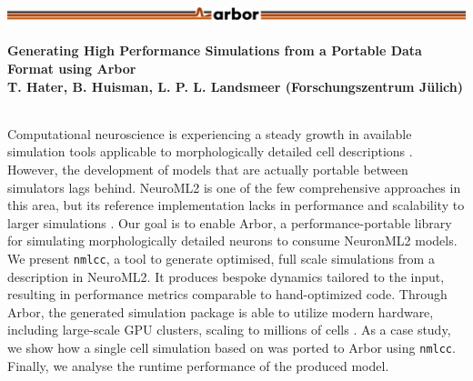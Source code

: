 \documentclass{beamer}
\begin{document}
\newcommand{\nmlcc}{\texttt{nmlcc}}

\begin{frame}[t, fragile]
  \frametitle{\includegraphics[width=0.66\linewidth]{img/arbor-lines-proto-colour-full}}
  \framesubtitle{Generating High Performance Simulations from a Portable Data Format using Arbor\\
    \tiny{T. Hater, B. Huisman, L. P. L. Landsmeer (Forschungszentrum Jülich)}}
  \begin{columns}[onlytextwidth,T]
    \begin{column}{0.76\textwidth}
      Computational neuroscience is experiencing a steady growth in available
      simulation tools applicable to morphologically detailed cell descriptions
      \cite{eden, neurogpu, carl, brian, arb, nrn}. However, the development of
      models that are actually portable between simulators lags behind. NeuroML2
      is one of the few comprehensive approaches in this area, but its reference
      implementation lacks in performance and scalability to larger simulations
      \cite{nml2}. Our goal is to enable Arbor, a performance-portable library
      for simulating morphologically detailed neurons to consume NeuronML2
      models. We present \nmlcc, a tool to generate optimised, full scale
      simulations from a description in NeuroML2. It produces bespoke dynamics
      tailored to the input, resulting in performance metrics comparable to
      hand-optimized code. Through Arbor, the generated simulation package is
      able to utilize modern hardware, including large-scale GPU clusters,
      scaling to millions of cells \cite{arb}. As a case study, we show how a
      single cell simulation based on \cite{Hay} was ported to Arbor using
      \nmlcc. Finally, we analyse the runtime performance of the produced model.


\end{column}
\end{columns}
\end{frame}
\end{document}
